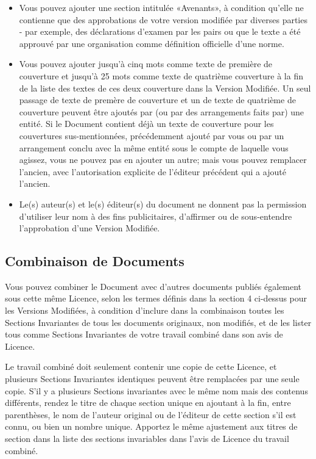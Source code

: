 \begin{itemize}
		\item Vous pouvez ajouter une section intitul\'ee «Avenants», à condition qu'elle ne contienne que des approbations de votre version modifi\'ee par diverses parties - par exemple, des d\'eclarations d'examen par les pairs ou que le texte a \'et\'e approuv\'e par une organisation comme d\'efinition officielle d'une norme.

		\item Vous pouvez ajouter jusqu'à cinq mots comme texte de première de couverture et jusqu'à 25 mots comme texte de quatrième couverture à la fin de la liste des textes de ces deux couverture dans la Version Modifi\'ee. Un seul passage de texte de premère de couverture et un de texte de quatrième de couverture peuvent être ajout\'es par (ou par des arrangements faits par) une entit\'e. Si le Document contient d\'ejà un texte de couverture pour les couvertures sus-mentionn\'ees, pr\'ec\'edemment ajout\'e par vous ou par un arrangement conclu avec la même entit\'e sous le compte de laquelle vous agissez, vous ne pouvez pas en ajouter un autre; mais vous pouvez remplacer l'ancien, avec l'autorisation explicite de l'\'editeur pr\'ec\'edent qui a ajout\'e l'ancien.

		\item Le(s) auteur(s) et le(s) \'editeur(s) du document ne donnent pas la permission d'utiliser leur nom à des fins publicitaires, d'affirmer ou de sous-entendre l'approbation d'une Version Modifi\'ee.
	\end{itemize} 

	\subsection{Combinaison de Documents}
	Vous pouvez combiner le Document avec d'autres documents publi\'es \'egalement sous cette même Licence, selon les termes d\'efinis dans la section 4 ci-dessus pour les Versions Modifi\'ees, à condition d'inclure dans la combinaison toutes les Sections Invariantes de tous les documents originaux, non modifi\'es, et de les lister tous comme Sections Invariantes de votre travail combin\'e dans son avis de Licence.

	Le travail combin\'e doit seulement contenir une copie de cette Licence, et plusieurs Sections Invariantes identiques peuvent être remplac\'ees par une seule copie. S'il y a plusieurs Sections invariantes avec le même nom mais des contenus diff\'erents, rendez le titre de chaque section unique en ajoutant à la fin, entre parenthèses, le nom de l'auteur original ou de l'\'editeur de cette section s'il est connu, ou bien un nombre unique. Apportez le même ajustement aux titres de section dans la liste des sections invariables dans l'avis de Licence du travail combin\'e.
	
